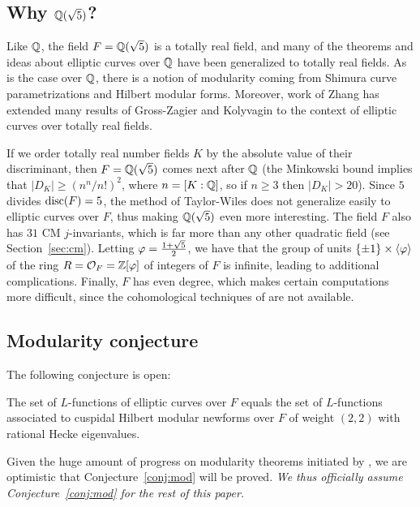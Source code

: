\documentclass{amsart}
\begin{document}
 
\subsection{Why $\mathbb{Q}(\sqrt{5})$?}

Like $\mathbb{Q}$, the field $F=\mathbb{Q}(\sqrt{5})$ is a totally real field, and
many of the theorems and ideas about elliptic curves over $\mathbb{Q}$ have
been generalized to totally real fields. As is the case over $\mathbb{Q}$,
there is a notion of modularity coming from Shimura curve
parametrizations and Hilbert modular forms.
Moreover, work of Zhang \cite{zhang:heightsshimura}  has extended many
results of Gross-Zagier \cite{gross-zagier} and Kolyvagin
\cite{kolyvagin:mordellweil} to the context of elliptic curves over
totally real fields.

If we order totally real number fields $K$ by the absolute value of
their discriminant, then $F=\mathbb{Q}(\sqrt{5})$ comes next after $\mathbb{Q}$ (the
Minkowski bound implies that $|D_K| \geq (n^n/n!)^2$, where
$n=[K:\mathbb{Q}]$, so if $n\geq 3$ then $|D_K|>20$). Since $5$ divides
$\operatorname{disc}(F)=5$,  the method of Taylor-Wiles does not generalize easily to elliptic
 curves over $F$, thus making $\mathbb{Q}(\sqrt{5})$ even more interesting. 
The field $F$ also has $31$ CM $j$-invariants, which is far more than
 any other quadratic field (see Section~\ref{sec:cm}).  Letting
 $\varphi=\frac{1+\sqrt{5}}{2}$, we have that the group of units
 $\{\pm 1\} \times \langle \varphi \rangle$ of the
ring $R=\mathcal{O}_F=\mathbb{Z}[\varphi]$ of integers of $F$ is infinite, leading to
additional complications.  Finally, $F$ has even degree, which
makes certain computations more difficult, since the cohomological
techniques of \cite{greenberg-voight:shimura} are not available. 


\subsection{Modularity conjecture}\label{sec:mod}
The following conjecture is open:
\begin{conjecture}[Modularity]\label{conj:mod}
  The set of $L$-functions of elliptic curves over $F$ equals the set
  of $L$-functions associated to cuspidal Hilbert modular newforms
  over $F$ of weight $(2,2)$ with rational Hecke eigenvalues.
\end{conjecture}
Given the huge amount of progress on modularity theorems initiated by
\cite{wiles:fermat}, we are optimistic that Conjecture~\ref{conj:mod}
will be proved.  {\em We thus officially assume
  Conjecture~\ref{conj:mod} for the rest of this paper.} \\
\end{document}
